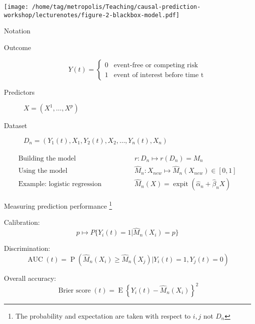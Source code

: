 \documentclass{beamer}\usepackage{listings}
\begin{document}
\begin{frame}[label={sec:org825ae0f}]{}
\begin{center}
\texttt{[image: /home/tag/metropolis/Teaching/causal-prediction-workshop/lecturenotes/figure-2-blackbox-model.pdf]}
\end{center}
\end{frame}
\begin{frame}[label={sec:org51ac803}]{Notation}
\begin{description}
\item[{Outcome}] $$Y(t)= \begin{cases}
      0 & \text{event-free or competing risk}\\
      1 & \text{event of interest before time t}
    \end{cases}$$
\item[{Predictors}] \qquad\(X = (X^{1},\dots,X^{p})\)
\item[{Dataset}] \qquad \(D_n=(Y_1(t),X_1, Y_2(t),X_2, \dots, Y_n(t),X_n)\)
\end{description}

\begin{align*}
\text{Building the model}&\qquad\qquad\ensuremath{r}: \ensuremath{D}_n\mapsto \ensuremath{r}(\ensuremath{D}_n)=\hat M_n\\[2em]
\text{Using the model}&\qquad\qquad \hat M_n : X_{new}\mapsto \hat M_n(X_{new})\in [0,1]\\[2em]
\text{Example: logistic regression} & \qquad\qquad \hat M_n(X) = \operatorname{expit}(\hat\alpha_n + \hat\beta_n X)
\end{align*}
\end{frame}
\begin{frame}[label={sec:org934dadd}]{Measuring prediction performance \footnote{The probability and expectation are taken with respect to \(i,j\) not \(D_n\)}}
\begin{block}{Calibration:}
\begin{equation*}
p\mapsto P\{Y_i(t)=1| \hat M_n(X_i)=p\}
\end{equation*}
\end{block}
\begin{block}{Discrimination:}
\begin{equation*}
  \operatorname{AUC}(t) = \operatorname{P}(\hat M_n(X_i)\ge \hat M_n(X_j)|Y_i(t)=1,Y_j(t)=0)
\end{equation*}
\end{block}
\begin{block}{Overall accuracy:}
\begin{equation*}
  \operatorname{Brier\ score}(t) = \operatorname{E}\left\{Y_i(t)-\hat M_n(X_i)\right\}^2
\end{equation*}
\end{block}
\end{frame}
\end{document}
